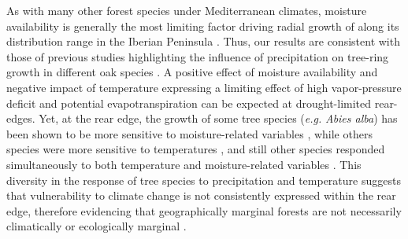 As with many other forest species under Mediterranean climates, moisture availability is generally the most limiting factor driving radial growth of \Qp along its distribution range in the Iberian Peninsula \autocite{GeaIzquierdoCanellas2014LocalClimate}. Thus, our results are consistent with those of previous studies highlighting the influence of precipitation on tree-ring growth in different oak species \autocites[\emph{e.g.}][]{Tessieretal1994DeciduousQuercus,DiFilippoetal2010ClimateChange,GeaIzquierdoetal2011TreeringsReflect,GarciaGonzalezSoutoHerrero2017EarlywoodVessel}. A positive effect of moisture availability and negative impact of temperature expressing a limiting effect of high vapor-pressure deficit and potential evapotranspiration can be expected at drought-limited rear-edges. Yet, at the rear edge, the growth of some tree species (\emph{e.g.} \emph{Abies alba}) has been shown to be more sensitive to moisture-related variables \autocite{MartinezSanchoGutierrezMerino2019EvidenceThat}, while others species were more sensitive to temperatures \autocite[\emph{e.g.} \emph{Pinus sylvestris},][]{Herreroetal2013VaryingClimate}, and still other species responded simultaneously to both temperature and moisture-related variables \autocites[\emph{e.g.} \emph{Fagus sylvatica},][]{DoradoLinanetal2017CoexistenceMediterraneanTemperate,DoradoLinanetal2017ClimateThreats}[\emph{Pinus nigra} subsp. \emph{salzmanii},][]{SanchezSalgueroetal2012DroughtMain}. This diversity in the response of tree species to precipitation and temperature suggests that vulnerability to climate change is not consistently expressed within the rear edge, therefore evidencing that geographically marginal forests are not necessarily climatically or ecologically marginal \autocite[see][ and references therein]{DoradoLinanetal2019GeographicalAdaptation}.

